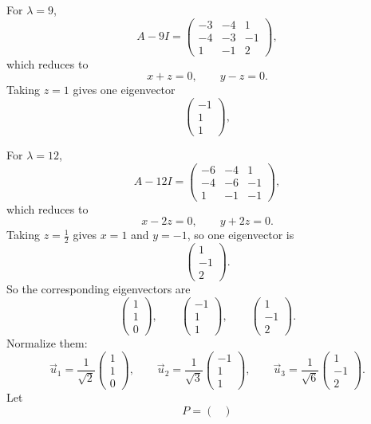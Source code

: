 \documentclass[10pt]{extarticle}
\begin{document}
\begin{enumerate}[label=(\alph*)]
For $\lambda=9$,
\[
A-9I=
\begin{pmatrix}
-3 & -4 & 1\\
-4 & -3 & -1\\
1 & -1 & 2
\end{pmatrix},
\]
which reduces to
\[
x+z=0,
\qquad
y-z=0.
\]
Taking $z=1$ gives one eigenvector
\[
\begin{pmatrix}
-1\\1\\1
\end{pmatrix},
\]

For $\lambda=12$,
\[
A-12I=
\begin{pmatrix}
-6 & -4 & 1\\
-4 & -6 & -1\\
1 & -1 & -1
\end{pmatrix},
\]
which reduces to
\[
x-2z=0,
\qquad
y+2z=0.
\]
Taking $z=\frac12$ gives $x=1$ and $y=-1$, so one eigenvector is
\[
\begin{pmatrix}
1\\-1\\2
\end{pmatrix}.
\]
So the corresponding eigenvectors are
\[
\begin{pmatrix}
1\\1\\0
\end{pmatrix},
\qquad
\begin{pmatrix}
-1\\1\\1
\end{pmatrix},
\qquad
\begin{pmatrix}
1\\-1\\2
\end{pmatrix}.
\]
Normalize them:
\[
\vec{u}_1=\frac{1}{\sqrt{2}}
\begin{pmatrix}
1\\1\\0
\end{pmatrix},
\qquad
\vec{u}_2=\frac{1}{\sqrt{3}}
\begin{pmatrix}
-1\\1\\1
\end{pmatrix},
\qquad
\vec{u}_3=\frac{1}{\sqrt{6}}
\begin{pmatrix}
1\\-1\\2
\end{pmatrix}.
\]
Let
\[
P=
\begin{pmatrix}

\end{pmatrix}\]
\end{enumerate}
\end{document}
